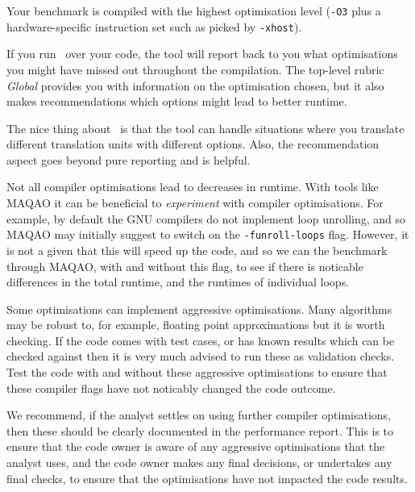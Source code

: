 \begin{checklist}
 \item Your benchmark is compiled with the highest optimisation level (\texttt{-O3} plus a hardware-specific instruction set such as picked by \texttt{-xhost}).
\end{checklist}

\begin{instructions}{\maqao}
 If you run \maqao~over your code, the tool will report back to you what
 optimisations you might have missed out throughout the compilation.
  The top-level rubric \emph{Global} provides you with information on the optimisation chosen, but it also makes recommendations which options might lead to better runtime.

 The nice thing about \maqao~is that the tool can handle situations where you translate different translation units with different options.
 Also, the recommendation aspect goes beyond pure reporting and is helpful.
\end{instructions}

Not all compiler optimisations lead to decreases in runtime. With
tools like MAQAO it can be beneficial to \emph{experiment} with compiler
optimisations. For example, by default the GNU compilers do not implement loop
unrolling, and so MAQAO may initially suggest to switch on the
\texttt{-funroll-loops} flag. However, it is not a given that this will speed
up the code, and so we can the benchmark through MAQAO, with and without this
flag, to see if there is noticable differences in the total runtime, and the
runtimes of individual loops.

Some optimisations can implement aggressive optimisations. Many algorithms may
be robust to, for example, floating point approximations but it is worth
checking. If the code comes with test cases, or has known results which can be
checked against then it is very much advised to run these as validation checks.
Test the code with and without these aggressive optimisations to ensure that
these compiler flags have not noticably changed the code outcome. 

We recommend, if the analyst settles on using further compiler optimisations,
then these should be clearly documented in the performance report.  This is to
ensure that the code owner is aware of any aggressive optimisations that the
analyst uses, and the code owner makes any final decisions, or undertakes any
final checks, to ensure that the optimisations have not impacted the code
results.

